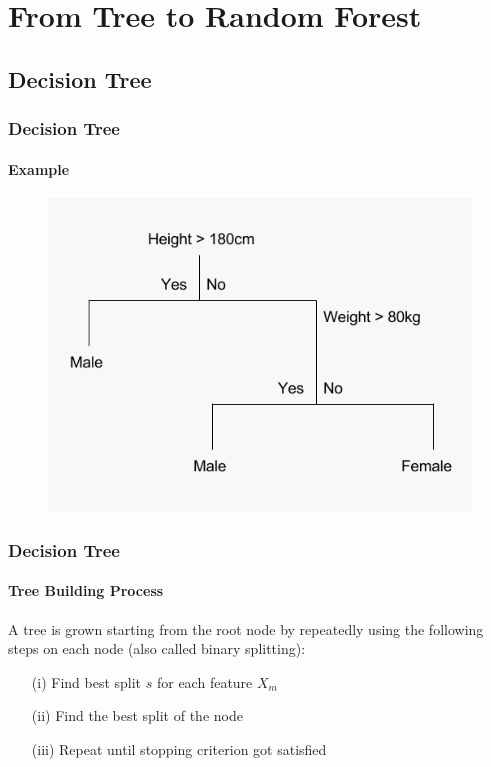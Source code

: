 \section{From Tree to Random Forest}
\subsection{Decision Tree}

\begin{frame}
	\frametitle{Decision Tree}
	\framesubtitle{Example}
	\begin{figure}		
		\includegraphics[height=0.7\textheight]{images/decision_tree_example.png}
	\end{figure}
\end{frame}

\begin{frame}
	\frametitle{Decision Tree}
	\framesubtitle{Tree Building Process}
	A tree is grown starting from the root node by repeatedly 
	using the following steps on each node (also called binary splitting):
	\smallbreak
	\begin{enumerate}
		\item[(i)] Find best split \(s\) for each feature \(X_{m}\)
		\item[(ii)] Find the best split of the node
		\item[(iii)] Repeat until stopping criterion got satisfied
	\end{enumerate}
\end{frame}	


